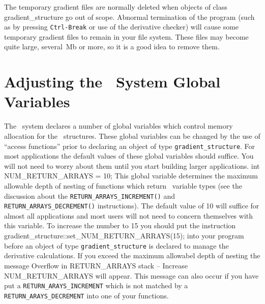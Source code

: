 \documentclass[12pt]{book}
\begin{document}
The temporary gradient files are normally deleted when objects of class 
{\ttt gradient_structure} go out of scope. Abnormal termination of
the program (such as by pressing {\tt Ctrl-Break} or use of the derivative
checker) will cause some temporary gradient files to remain
in your file system. These files may become quite large, several~Mb or more,
 so it is a good idea to remove them.
\endchapter

\htmlnewfile 
\section{Adjusting the \AD\ System Global Variables}

The \AD\ system declares a number of global variables which
control memory allocation for the \AD\ structures.
These global variables can be changed by the use of
``access functions'' prior to declaring an object of type
{\tt gradient\_structure}.  
For most applications the
default values of these global variables should suffice. You will
not need to worry about them until you start building larger applications.
\beginexample
int NUM\_RETURN\_ARRAYS = 10;  
\endexample
{}  
\noindent This global variable determines the maximum allowable depth of 
nesting of functions which return \AD\ variable types (see the discussion about
the {\tt RETURN\_ARRAYS\_INCREMENT()} and 
{\tt RETURN\_ARRAYS\_DECREMENT()} instructions).
The default value of 10 will suffice for almost all applications and
most users will not need to concern themselves with this variable.
To increase the number to 15 you should put the instruction
\beginexample
gradient\_structure::set\_NUM\_RETURN\_ARRAYS(15);  
\endexample
\noindent into your program before an object of type {\tt gradient\_structure}
is declared to manage the derivative calculations.
If you exceed the maximum allowabel depth of nesting the message
\beginexample
Overflow in RETURN_ARRAYS stack -- Increase NUM_RETURN_ARRAYS
\endexample
will appear. This message can also occur if you have put a
{\tt RETURN\_ARAYS\_INCREMENT} which is not matched by a
{\tt RETURN\_ARAYS\_DECREMENT} into one of your functions.
\end{document}
